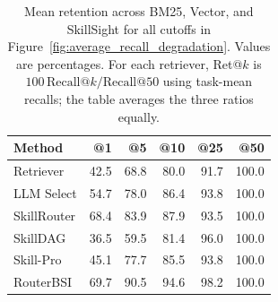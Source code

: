 \begin{table}[t]
\centering
\small
\setlength{\tabcolsep}{3pt}
\begin{tabular}{lrrrrr}
\toprule
Method & @1 & @5 & @10 & @25 & @50 \\
\midrule
Retriever & 42.5 & 68.8 & 80.0 & 91.7 & 100.0 \\
LLM Select & 54.7 & 78.0 & 86.4 & 93.8 & 100.0 \\
SkillRouter & 68.4 & 83.9 & 87.9 & 93.5 & 100.0 \\
SkillDAG & 36.5 & 59.5 & 81.4 & 96.0 & 100.0 \\
Skill-Pro & 45.1 & 77.7 & 85.5 & 93.8 & 100.0 \\
RouterBSI & 69.7 & 90.5 & 94.6 & 98.2 & 100.0 \\
\bottomrule
\end{tabular}
\caption{Mean retention across BM25, Vector, and SkillSight for all cutoffs in Figure~\ref{fig:average_recall_degradation}. Values are percentages. For each retriever, Ret@$k$ is $100\,\mathrm{Recall}@k/\mathrm{Recall}@50$ using task-mean recalls; the table averages the three ratios equally.}
\label{tab:app-retention-mean}
\end{table}
